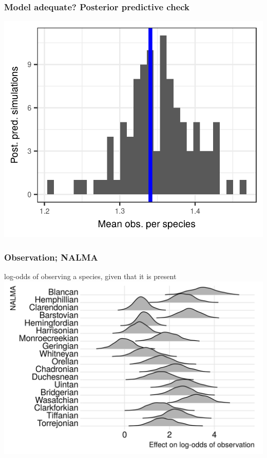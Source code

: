 \documentclass{beamer}
\begin{document}
\begin{frame}
  \frametitle{Model adequate? Posterior predictive check}
  \begin{center}
    \includegraphics[height=0.8\textheight,width=\textwidth,keepaspectratio=true]{figure/pred_occ_bd}
  \end{center}
\end{frame}

\begin{frame}
  \frametitle{Observation; NALMA}
  \begin{center}
    log-odds of observing a species, given that it is present
    \includegraphics[height=0.8\textheight,width=\textwidth,keepaspectratio=true]{figure/time_observation}
  \end{center}
\end{frame}
\end{document}
